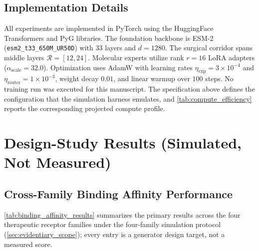 \documentclass{article}
\theoremstyle{definition}
\begin{document}
\subsection{Implementation Details}
All experiments are implemented in PyTorch using the HuggingFace Transformers and PyG libraries. The foundation backbone is ESM-2 (\texttt{esm2\_t33\_650M\_UR50D}) with $33$ layers and $d = 1280$. The surgical corridor spans middle layers $\mathcal{R} = [12, 24]$. Molecular experts utilize rank $r = 16$ LoRA adapters ($\alpha_{\text{scale}} = 32.0$). Optimization uses AdamW with learning rates $\eta_{\text{exp}} = 3 \times 10^{-4}$ and $\eta_{\text{router}} = 1 \times 10^{-3}$, weight decay $0.01$, and linear warmup over $100$ steps. No training run was executed for this manuscript. The specification above defines the configuration that the simulation harness emulates, and \cref{tab:compute_efficiency} reports the corresponding projected compute profile.

\section{Design-Study Results (Simulated, Not Measured)}
\label{sec:results}

\subsection{Cross-Family Binding Affinity Performance}
\cref{tab:binding_affinity_results} summarizes the primary results across the four therapeutic receptor families under the four-family simulation protocol (\cref{sec:evidentiary_scope}); every entry is a generator design target, not a measured score.
\end{document}
